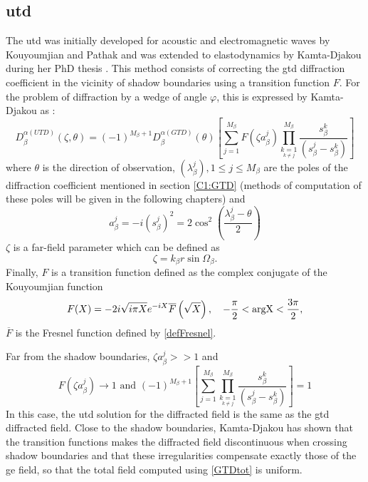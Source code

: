 \subsection{\acrfull{utd}}
The \acrfull{utd} was initially developed for acoustic and electromagnetic waves by Kouyoumjian and Pathak \cite{Kouyoumjian,PathakKouyou} and was extended to elastodynamics by Kamta-Djakou during her PhD thesis \cite{Audrey,AKDthese}. This method consists of correcting the \acrshort{gtd} diffraction coefficient in the vicinity of shadow boundaries using a transition function $F$. For the problem of diffraction by a wedge of angle $\varphi$, this is expressed by Kamta-Djakou \cite{AKDthese} as :
\begin{equation}
    D_{\beta}^{\alpha(UTD)}(\zeta,\theta)=(-1)^{M_{\beta}+1}D_{\beta}^{\alpha(GTD)}(\theta)\left[ \sum_{j=1}^{M_{\beta}} F(\zeta a^j_{\beta})\prod_{\underset{k\neq j}{k=1}}^{M_{\beta}} \dfrac{s_\beta^{k}}{(s_\beta^{j}-s_\beta^{k})}\right]
    \label{DUTDGTD}
\end{equation}
where $\theta$ is the direction of observation, $(\lambda^j_{\beta}), 1\leq j\leq M_{\beta}$ are the poles of the diffraction coefficient mentioned in section \ref{C1:GTD} (methods of computation of these poles will be given in the following chapters) and 
\begin{equation}
    a_{\beta}^j=-i(s_{\beta}^j)^2=2\cos^2\left(\frac{\lambda_{\beta}^j-\theta}{2}\right)
\end{equation}
$\zeta$ is a far-field parameter which can be defined as
\begin{equation}
    \zeta=k_{\beta}r\sin\Omega_{\beta}.
\end{equation}
Finally, $F$ is a transition function defined as the complex conjugate of the Kouyoumjian function \cite{Kouyoumjian}
\begin{equation}
    F(X)=-2i\sqrt{i\pi X}e^{-iX}\overline{F}\left(\sqrt{X}\right), \hspace{1em} -\frac{\pi}{2}< \rm arg X < \frac{3\pi}{2},
\end{equation}
$\overline{F}$ is the Fresnel function defined by \eqref{defFresnel}.

Far from the shadow boundaries, $\zeta a_{\beta}^j >>1$ and
\begin{equation}
F(\zeta a_{\beta}^j) \rightarrow 1 \mbox{ and } (-1)^{M_{\beta}+1}\left[ \sum_{j=1}^{M_{\beta}} \prod_{\underset{k\neq j}{k=1}}^{M_{\beta}} \dfrac{s_\beta^{k}}{(s_\beta^{j}-s_\beta^{k})}\right]=1
\end{equation}
In this case, the \acrshort{utd} solution for the diffracted field is the same as the \acrshort{gtd} diffracted field. Close to the shadow boundaries, Kamta-Djakou \cite{AKDthese} has shown that the transition functions makes the diffracted field discontinuous when crossing shadow boundaries and that these irregularities compensate exactly those of the \acrshort{ge} field, so that the total field computed using \eqref{GTDtot} is uniform.

